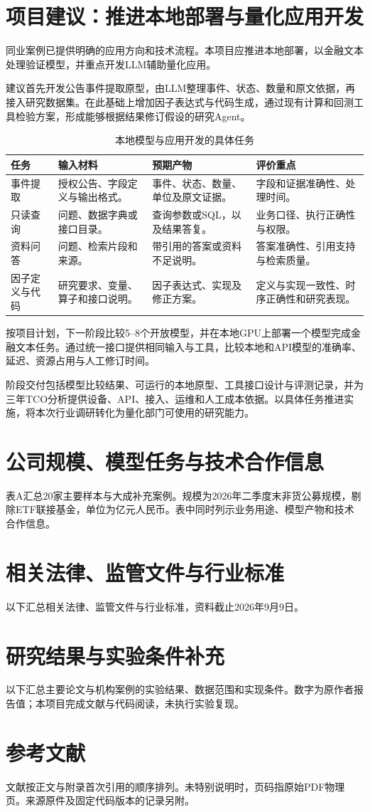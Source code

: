 \documentclass[11pt,a4paper,fontset=none]{ctexart}
\begin{document}
\section{项目建议：推进本地部署与量化应用开发}
同业案例已提供明确的应用方向和技术流程。本项目应推进本地部署，以金融文本处理验证模型，并重点开发LLM辅助量化应用。

建议首先开发公告事件提取原型，由LLM整理事件、状态、数量和原文依据，再接入研究数据集。在此基础上增加因子表达式与代码生成，通过现有计算和回测工具检验方案，形成能够根据结果修订假设的研究Agent。

\begin{table}[H]\small\centering
\caption{本地模型与应用开发的具体任务}
\begin{tabularx}{\linewidth}{@{}P{26mm}Y Y Y@{}}\toprule
任务 & 输入材料 & 预期产物 & 评价重点\\\midrule
事件提取 & 授权公告、字段定义与输出格式。 & 事件、状态、数量、单位及原文证据。 & 字段和证据准确性、处理时间。\\
只读查询 & 问题、数据字典或接口目录。 & 查询参数或SQL，以及结果答复。 & 业务口径、执行正确性与权限。\\
资料问答 & 问题、检索片段和来源。 & 带引用的答案或资料不足说明。 & 答案准确性、引用支持与检索质量。\\
因子定义与代码 & 研究要求、变量、算子和接口说明。 & 因子表达式、实现及修正方案。 & 定义与实现一致性、时序正确性和研究表现。\\\bottomrule
\end{tabularx}
\end{table}

按项目计划，下一阶段比较5--8个开放模型，并在本地GPU上部署一个模型完成金融文本任务。通过统一接口提供相同输入与工具，比较本地和API模型的准确率、延迟、资源占用与人工修订时间。

阶段交付包括模型比较结果、可运行的本地原型、工具接口设计与评测记录，并为三年TCO分析提供设备、API、接入、运维和人工成本依据。以具体任务推进实施，将本次行业调研转化为量化部门可使用的研究能力。
\clearpage

\appendix
\section{公司规模、模型任务与技术合作信息}
表A汇总20家主要样本与大成补充案例。规模为2026年二季度末非货公募规模，剔除ETF联接基金，单位为亿元人民币。表中同时列示业务用途、模型产物和技术合作信息。

\clearpage
\section{相关法律、监管文件与行业标准}
以下汇总相关法律、监管文件与行业标准，资料截止2026年9月9日。

\clearpage
\section{研究结果与实验条件补充}
以下汇总主要论文与机构案例的实验结果、数据范围和实现条件。数字为原作者报告值；本项目完成文献与代码阅读，未执行实验复现。
\setcounter{table}{0}
\renewcommand{\thetable}{C.\arabic{table}}

\clearpage
\section{参考文献}
文献按正文与附录首次引用的顺序排列。未特别说明时，页码指原始PDF物理页。来源原件及固定代码版本的记录另附。

\end{document}
